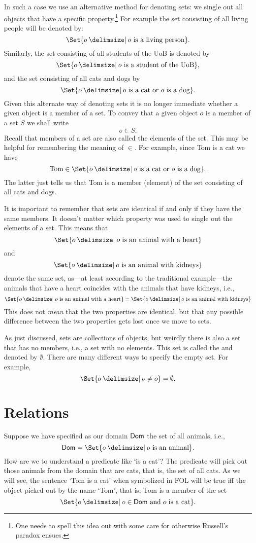 In such a case we use an alternative method for denoting sets: we single out all objects that have a specific property.\footnote{One needs to spell this idea out with some care for otherwise Russell's paradox ensues.} For example the set consisting of all living people will be denoted by:
$$\Set{o \given o\text{ is a living person}}.$$
Similarly, the set consisting of all students of the UoB is denoted by
$$\Set{o \given o\text{ is a student of the UoB}},$$
and the set consisting of all cats and dogs by
$$\Set{o \given o\text{ is a cat or }o\text{ is a dog}}.$$
Given this alternate way of denoting sets it is no longer immediate whether a given object is a member of a set. To convey that a given object $o$ is a member of a set $S$ we shall write
$$o\in S.$$
Recall that members of a set are also called the elements of the set. This may be helpful for remembering the meaning of $\in$. For example, since Tom is a cat we have
$$\text{Tom}\in\Set{o \given o\text{ is a cat or }o\text{ is a dog}}.$$
The latter just tells us that Tom is a member (element) of the set consisting of all cats and dogs. 

It is important to remember that sets are identical if and only if they have the same members. It doesn't matter which property was used to single out the elements of a set. This means that 
$$\Set{o \given o\text{ is an animal with a heart}}$$
and $$\Set{o \given o\text{ is an animal with kidneys}}$$
denote the same set, as---at least according to the traditional example---the animals that have a heart coincides with the animals that have kidneys, i.e.,
$$\Set{o \given o\text{ is an animal with a heart}}=\Set{o\given o\text{ is an animal with kidneys}}$$
This does not \emph{mean} that the two properties are identical, but that any possible difference between the two properties gets lost once we move to sets.

As just discussed, sets are collections of objects, but weirdly there is also a set that has no members, i.e., a set with no elements. This set is called the  and denoted by $\emptyset$. There are many different ways to specify the empty set. For example,
$$\Set{o \given o\neq o}=\emptyset.$$



\section{Relations}
Suppose we have specified as our domain $\mathsf{Dom}$ the set of all animals, i.e.,
$$\domain=\Set{o \given o\text{ is an animal}}.$$
How are we to understand a predicate like `is a cat'? The predicate will pick out those animals from the domain that are cats, that is, the set of all cats. As we will see, the sentence `Tom is a cat' when symbolized in FOL will be true iff the object picked out by the name `Tom', that is, Tom is a member of the set
$$\Set{o \given o\in \domain\text{ and }o\text{ is a cat}}.$$

